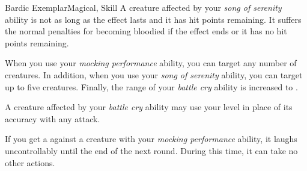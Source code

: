 \begin{feat}{Bardic Exemplar}{Magical, Skill}
         A creature affected by your \textit{song of serenity} ability is not  as long as the effect lasts and it has hit points remaining.
        It suffers the normal penalties for becoming bloodied if the effect ends or it has no hit points remaining.

         When you use your \textit{mocking performance} ability, you can target any number of creatures.
        In addition, when you use your \textit{song of serenity} ability, you can target up to five creatures.
        Finally, the range of your \textit{battle cry} ability is increased to \rnglong.

         A creature affected by your \textit{battle cry} ability may use your level in place of its accuracy with any attack.

         If you get a  against a creature with your \textit{mocking performance} ability, it laughs uncontrollably until the end of the next round.
        During this time, it can take no other actions.
    \end{feat}

